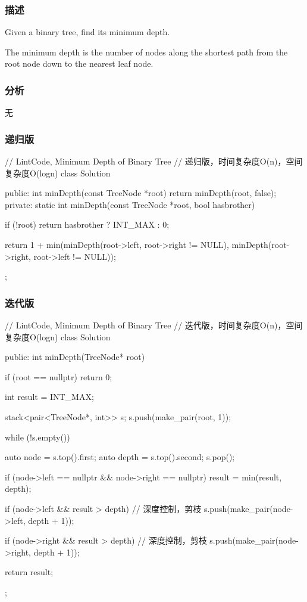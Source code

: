 \subsubsection{描述}
Given a binary tree, find its minimum depth.

The minimum depth is the number of nodes along the shortest path from the root node down to the nearest leaf node.


\subsubsection{分析}
无


\subsubsection{递归版}
\begin{Code}
// LintCode, Minimum Depth of Binary Tree
// 递归版，时间复杂度O(n)，空间复杂度O(logn)
class Solution {
public:
    int minDepth(const TreeNode *root) {
        return minDepth(root, false);
    }
private:
    static int minDepth(const TreeNode *root, bool hasbrother) {
        if (!root) return hasbrother ? INT_MAX : 0;

        return 1 + min(minDepth(root->left, root->right != NULL),
                minDepth(root->right, root->left != NULL));
    }
};
\end{Code}


\subsubsection{迭代版}
\begin{Code}
// LintCode, Minimum Depth of Binary Tree
// 迭代版，时间复杂度O(n)，空间复杂度O(logn)
class Solution {
public:
    int minDepth(TreeNode* root) {
        if (root == nullptr)
            return 0;

        int result = INT_MAX;

        stack<pair<TreeNode*, int>> s;
        s.push(make_pair(root, 1));

        while (!s.empty()) {
            auto node = s.top().first;
            auto depth = s.top().second;
            s.pop();

            if (node->left == nullptr && node->right == nullptr)
                result = min(result, depth);

            if (node->left && result > depth) // 深度控制，剪枝
                s.push(make_pair(node->left, depth + 1));

            if (node->right && result > depth) // 深度控制，剪枝
                s.push(make_pair(node->right, depth + 1));
        }

        return result;
    }
};
\end{Code}

